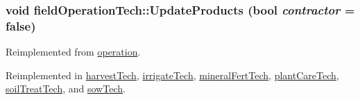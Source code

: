 \label{classfield_operation_tech_a4830e2b43c699fb767cc85242a59e875}
\hypertarget{classfield_operation_tech_ab0b2bf71efca78b637837fc4d0e3a9d4}{
\subsubsection[{UpdateProducts}]{\setlength{\rightskip}{0pt plus 5cm}void fieldOperationTech::UpdateProducts (bool {\em contractor} = {\ttfamily false})}}
\label{classfield_operation_tech_ab0b2bf71efca78b637837fc4d0e3a9d4}


Reimplemented from \hyperlink{classoperation_a3f18f5e71dd6bdfdf304ed1a24e7ac2f}{operation}.

Reimplemented in \hyperlink{classharvest_tech_a80aa806fd5fa0f652b8ead63fb8976a4}{harvestTech}, \hyperlink{classirrigate_tech_a5a125198ead652bcf1c8307fbc8ef3b5}{irrigateTech}, \hyperlink{classmineral_fert_tech_aeaae651d9f15846abd36be1a03e782db}{mineralFertTech}, \hyperlink{classplant_care_tech_a877ed4e1f3d84637783c1ac0474a6bc6}{plantCareTech}, \hyperlink{classsoil_treat_tech_aea3565eebbd55354cbee50d13c1c892a}{soilTreatTech}, and \hyperlink{classsow_tech_a0cfbd371272aa15a18bca486a2926464}{sowTech}.

